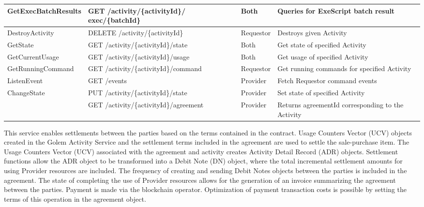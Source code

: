 \begin{enumerate}
\begin{enumerate}
\begin{table}[H]
\begin{center}
\begin{tabular}{|p{3cm}|p{7cm}|p{1.5cm}|p{4cm}|}
GetExecBatchResults 		& GET /activity/\{activityId\}/ \newline exec/\{batchId\}	&	Both 	&  Queries for ExeScript batch result	\\
\hline

DestroyActivity				& DELETE /activity/\{activityId\}	& Requestor & Destroys given Activity \\
\hline

GetState					& GET /activity/\{activityId\}/state	& Both	& Get state of specified Activity \\
\hline

GetCurrentUsage				& GET /activity/\{activityId\}/usage	& Both & Get usage of specified Activity \\
\hline

GetRunningCommand			& GET /activity/\{activityId\}/command	& Requestor & Get running commands for specified Activity \\
\hline

ListenEvent					& GET /events	&	Provider	&	Fetch Requestor command events \\
\hline

ChangeState					& PUT /activity/\{activityId\}/state & Provider & Set state of specified Activity \\
\hline

							& GET /activity/\{activityId\}/agreement & Provider & Returns agreementId corresponding to the Activity \\
\hline

\end{tabular}
\end{center}
\end{table}

\end{enumerate}

\end{enumerate}



This service enables settlements between the parties based on the terms contained in the contract. 
Usage Counters Vector (UCV) objects created in the Golem Activity Service and the settlement terms included in the agreement 
are used to settle the sale-purchase item. The Usage Counters Vector (UCV) associated with the agreement and activity creates 
Activity Detail Record (ADR) objects. Settlement functions allow the ADR object to be transformed into a Debit Note (DN) object, 
where the total incremental settlement amounts for using Provider resources are included. The frequency of creating and sending 
Debit Notes objects between the parties is included in the agreement. The state of completing the use of Provider resources allows 
for the generation of an invoice summarizing the agreement between the parties. 
Payment is made via the blockchain operator. Optimization of payment transaction costs is possible by setting the terms of this operation 
in the agreement object.

